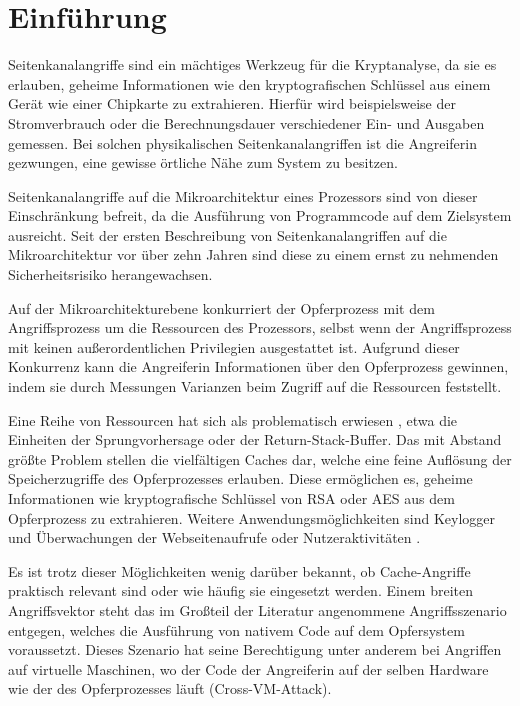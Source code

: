 \chapter{Einführung}
\label{chapter:introduction}


Seitenkanalangriffe sind ein mächtiges Werkzeug für die Kryptanalyse, da sie es erlauben, geheime Informationen wie den kryptografischen Schlüssel aus einem Gerät wie einer Chipkarte zu extrahieren.
Hierfür wird beispielsweise der Stromverbrauch oder die Berechnungsdauer verschiedener Ein- und Ausgaben gemessen.
Bei solchen physikalischen Seitenkanalangriffen ist die Angreiferin gezwungen, eine gewisse örtliche Nähe zum System zu besitzen.

Seitenkanalangriffe auf die Mikroarchitektur eines Prozessors sind von dieser Einschränkung befreit, da die
Ausführung von Programmcode 
auf dem Zielsystem ausreicht.
Seit der ersten Beschreibung von Seitenkanalangriffen auf die Mikroarchitektur vor über zehn Jahren sind diese zu einem ernst zu nehmenden Sicherheitsrisiko herangewachsen.

Auf der Mikroarchitekturebene konkurriert der Opferprozess mit dem Angriffsprozess um die Ressourcen des Prozessors, selbst wenn der Angriffsprozess mit keinen außerordentlichen Privilegien ausgestattet ist.
Aufgrund dieser Konkurrenz kann die Angreiferin Informationen über den Opferprozess gewinnen, indem sie durch Messungen Varianzen beim Zugriff auf die Ressourcen feststellt.

Eine Reihe von Ressourcen hat sich als problematisch erwiesen %
, etwa die Einheiten der Sprungvorhersage oder der Return-Stack-Buffer.
Das mit Abstand größte Problem stellen die vielfältigen Caches dar, welche eine feine Auflösung der Speicherzugriffe des Opferprozesses erlauben.
Diese ermöglichen es, geheime Informationen wie kryptografische Schlüssel von RSA \cite{CacheBleedOpenSSLRSA} oder AES \cite{BernsteinAES} aus dem Opferprozess zu extrahieren.
Weitere Anwendungsmöglichkeiten sind Keylogger \cite{Keylogger} und Überwachungen der Webseitenaufrufe oder Nutzeraktivitäten \cite{TheSpyInTheSandbox}.

Es ist trotz dieser Möglichkeiten wenig darüber bekannt, ob Cache-Angriffe praktisch relevant sind oder wie häufig sie eingesetzt werden.
Einem breiten Angriffsvektor steht das im Großteil der Literatur angenommene Angriffsszenario entgegen, welches die Ausführung von nativem Code auf dem Opfersystem voraussetzt.
Dieses Szenario hat seine Berechtigung unter anderem bei Angriffen auf virtuelle Maschinen, wo der Code der Angreiferin auf der selben Hardware wie der des Opferprozesses läuft (Cross-VM-Attack).

